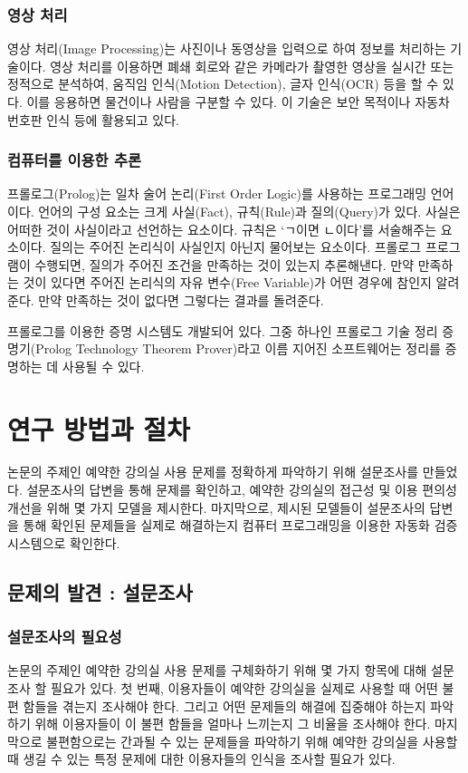 \documentclass[11pt,a4paper]{article}
\begin{document}
\subsubsection{영상 처리}
영상 처리(Image Processing)는 사진이나 동영상을 입력으로 하여 정보를 처리하는
기술이다. 영상 처리를 이용하면 폐쇄 회로와 같은 카메라가 촬영한 영상을 실시간
또는 정적으로 분석하여, 움직임 인식(Motion Detection), 글자 인식(OCR) 등을 할
수 있다. 이를 응용하면 물건이나 사람을 구분할 수 있다. 이 기술은 보안 목적이나
자동차 번호판 인식 등에 활용되고 있다.

\subsubsection{컴퓨터를 이용한 추론}
프롤로그(Prolog)는 일차 술어 논리(First Order Logic)를 사용하는 프로그래밍
언어이다. 언어의 구성 요소는 크게 사실(Fact), 규칙(Rule)과 질의(Query)가 있다.
사실은 어떠한 것이 사실이라고 선언하는 요소이다. 규칙은 ‘ㄱ이면 ㄴ이다’를
서술해주는 요소이다. 질의는 주어진 논리식이 사실인지 아닌지 물어보는 요소이다.
프롤로그 프로그램이 수행되면, 질의가 주어진 조건을 만족하는 것이 있는지
추론해낸다. 만약 만족하는 것이 있다면 주어진 논리식의 자유 변수(Free
Variable)가 어떤 경우에 참인지 알려준다. 만약 만족하는 것이 없다면 그렇다는
결과를 돌려준다.

프롤로그를 이용한 증명 시스템도 개발되어 있다. 그중 하나인 프롤로그 기술 정리
증명기(Prolog Technology Theorem Prover)라고 이름 지어진 소프트웨어는 정리를
증명하는 데 사용될 수 있다.

\section{연구 방법과 절차}
논문의 주제인 예약한 강의실 사용 문제를 정확하게 파악하기 위해 설문조사를
만들었다. 설문조사의 답변을 통해 문제를 확인하고, 예약한 강의실의 접근성 및
이용 편의성 개선을 위해 몇 가지 모델을 제시한다. 마지막으로, 제시된 모델들이
설문조사의 답변을 통해 확인된 문제들을 실제로 해결하는지 컴퓨터 프로그래밍을
이용한 자동화 검증 시스템으로 확인한다.

\subsection{문제의 발견 : 설문조사}

\subsubsection{설문조사의 필요성}
논문의 주제인 예약한 강의실 사용 문제를 구체화하기 위해 몇 가지 항목에 대해 설문조사 할 필요가 있다.
첫 번째, 이용자들이 예약한 강의실을 실제로 사용할 때 어떤 불편 함들을 겪는지 조사해야 한다.
그리고 어떤 문제들의 해결에 집중해야 하는지 파악하기 위해 이용자들이 이 불편 함들을 얼마나 느끼는지 그 비율을 조사해야 한다.
마지막으로 불편함으로는 간과될 수 있는 문제들을 파악하기 위해 예약한 강의실을 사용할 때 생길 수 있는 특정 문제에 대한 이용자들의 인식을 조사할 필요가 있다.
\end{document}
